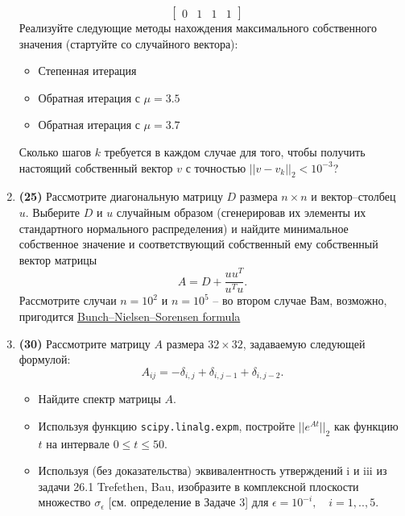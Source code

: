 \documentclass[prb,papersize=a4paper,notitlepage]{revtex4-1}%
\begin{document}
\begin{enumerate}
$$\begin{bmatrix}
0 & 1 & 1 & 1
\end{bmatrix}\quad
$$
Реализуйте следующие методы нахождения максимального собственного значения (стартуйте со случайного вектора):
\begin{itemize}
\item Степенная итерация
\item Обратная итерация с $\mu = 3.5$
\item Обратная итерация с $\mu = 3.7$
\end{itemize}
Сколько шагов $k$ требуется в каждом случае для того, чтобы получить настоящий собственный вектор $v$ с точностью $||v-v_k||_2 < 10^{-3}$?
\item \textbf{(25)} Рассмотрите диагональную матрицу $D$ размера $n\times n$ и вектор--столбец $u$. Выберите $D$ и $u$ случайным образом (сгенерировав их элементы их стандартного нормального распределения) и найдите минимальное собственное значение и соответствующий собственный ему собственный вектор матрицы
$$A = D + \frac{u u^T}{u^T u}.$$ Рассмотрите случаи $n=10^2$ и $n=10^5$ -- во втором случае Вам, возможно, пригодится \href{https://en.wikipedia.org/wiki/Bunch%E2%80%93Nielsen%E2%80%93Sorensen_formula}{Bunch--Nielsen--Sorensen formula}
\item \textbf{(30)} Рассмотрите матрицу $A$ размера $32\times 32$, задаваемую следующей формулой:
$$
A_{ij} = -\delta_{i,j} + \delta_{i, j-1} + \delta_{i, j-2}.
$$
\begin{itemize}
\item Найдите спектр матрицы $A$.
\item Используя функцию \lstinline{scipy.linalg.expm}, постройте $||e^{At}||_2$ как функцию $t$ на интервале $0\le t \le 50$.
\item Используя (без доказательства) эквивалентность утверждений i и iii из задачи 26.1 Trefethen, Bau, изобразите в комплексной плоскости множество $\sigma_\epsilon$ [см. определение в Задаче 3] для $\epsilon = 10^{-i},\quad i=1,..,5$.
\end{itemize}
\end{enumerate}
\end{document}
